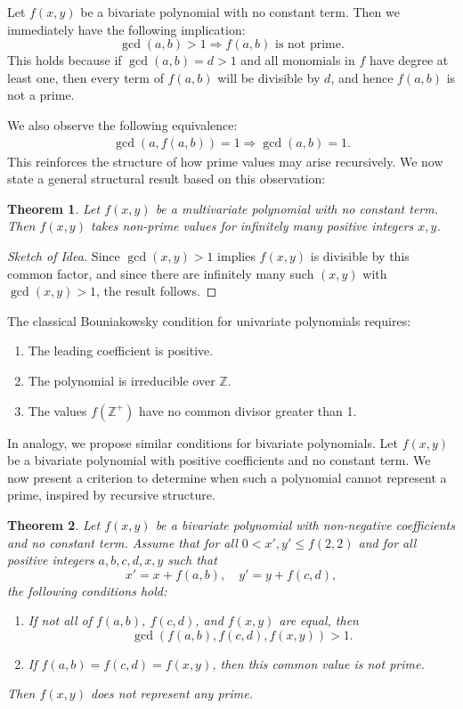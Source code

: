 \documentclass[a4paper,11pt]{article}
\newtheorem{theorem}{Theorem}
\begin{document}
	Let $f(x, y)$ be a bivariate polynomial with no constant term. Then we immediately have the following implication:
	\[
	\gcd(a, b) > 1 \Rightarrow f(a, b) \text{ is not prime}.
	\]
	This holds because if $\gcd(a, b) = d > 1$ and all monomials in $f$ have degree at least one, then every term of $f(a, b)$ will be divisible by $d$, and hence $f(a, b)$ is not a prime.
	
	We also observe the following equivalence:
	\begin{align}\label{equeq}
		\gcd(a, f(a, b)) = 1 \Rightarrow \gcd(a, b) = 1.
	\end{align}
	This reinforces the structure of how prime values may arise recursively. We now state a general structural result based on this observation:
	
	\begin{theorem}\label{th}
		Let $f(x, y)$ be a multivariate polynomial with no constant term. Then $f(x, y)$ takes non-prime values for infinitely many positive integers $x, y$.
	\end{theorem}
	
	\begin{proof}[Sketch of Idea]
		Since $\gcd(x, y) > 1$ implies $f(x, y)$ is divisible by this common factor, and since there are infinitely many such $(x, y)$ with $\gcd(x, y) > 1$, the result follows.
	\end{proof}
	
	The classical Bouniakowsky condition for univariate polynomials requires:
	\begin{enumerate}
		\item The leading coefficient is positive.
		\item The polynomial is irreducible over $\mathbb{Z}$.
		\item The values $f(\mathbb{Z}^+)$ have no common divisor greater than 1.
	\end{enumerate}
	
	In analogy, we propose similar conditions for bivariate polynomials. Let $f(x, y)$ be a bivariate polynomial with positive coefficients and no constant term. We now present a criterion to determine when such a polynomial cannot represent a prime, inspired by recursive structure.
	
	\begin{theorem}\label{mth}
		Let $f(x, y)$ be a bivariate polynomial with non-negative coefficients and no constant term. Assume that for all $0 < x', y' \leq f(2,2)$ and for all positive integers $a, b, c, d, x, y$ such that
		\[
		x' = x + f(a, b), \quad y' = y + f(c, d),
		\]
		the following conditions hold:
		\begin{enumerate}
			\item If not all of $f(a,b)$, $f(c,d)$, and $f(x,y)$ are equal, then
			\[
			\gcd(f(a,b), f(c,d), f(x,y)) > 1.
			\]
			\item If $f(a,b) = f(c,d) = f(x,y)$, then this common value is not prime.
		\end{enumerate}
		Then $f(x, y)$ does not represent any prime.
	\end{theorem}
	
\end{document}
